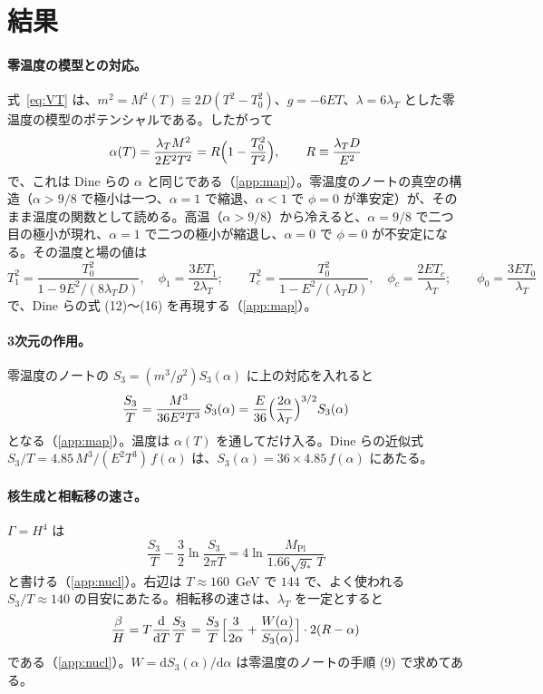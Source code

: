 \documentclass[a4paper,10pt]{ltjsarticle}
\newcommand{\dd}{\mathrm{d}}
\begin{document}
\section{結果}\label{sec:results}

\paragraph{零温度の模型との対応。}式~\eqref{eq:VT} は、$m^2=M^2(T)\equiv2D(T^2-T_0^2)$、$g=-6ET$、$\lambda=6\lambda_T$ とした零温度の模型のポテンシャルである。したがって
\begin{equation}
\alpha(T)=\frac{\lambda_TM^2}{2E^2T^2}=R\Bigl(1-\frac{T_0^2}{T^2}\Bigr),\qquad R\equiv\frac{\lambda_TD}{E^2}
\label{eq:alphaT}
\end{equation}
で、これは Dine らの $\alpha$ と同じである（\ref{app:map}）。零温度のノートの真空の構造（$\alpha>9/8$ で極小は一つ、$\alpha=1$ で縮退、$\alpha<1$ で $\phi=0$ が準安定）が、そのまま温度の関数として読める。高温（$\alpha>9/8$）から冷えると、$\alpha=9/8$ で二つ目の極小が現れ、$\alpha=1$ で二つの極小が縮退し、$\alpha=0$ で $\phi=0$ が不安定になる。その温度と場の値は
\begin{equation}
T_1^2=\frac{T_0^2}{1-9E^2/(8\lambda_TD)},\quad\phi_1=\frac{3ET_1}{2\lambda_T};\qquad
T_c^2=\frac{T_0^2}{1-E^2/(\lambda_TD)},\quad\phi_c=\frac{2ET_c}{\lambda_T};\qquad
\phi_0=\frac{3ET_0}{\lambda_T}
\label{eq:crit}
\end{equation}
で、Dine らの式 (12)〜(16) を再現する（\ref{app:map}）。

\paragraph{3次元の作用。}零温度のノートの $S_3=(m^3/g^2)S_3(\alpha)$ に上の対応を入れると
\begin{equation}
\frac{S_3}{T}=\frac{M^3}{36E^2T^3}\,S_3(\alpha)=\frac{E}{36}\Bigl(\frac{2\alpha}{\lambda_T}\Bigr)^{3/2}S_3(\alpha)
\label{eq:S3T}
\end{equation}
となる（\ref{app:map}）。温度は $\alpha(T)$ を通してだけ入る。Dine らの近似式 $S_3/T=4.85\,M^3/(E^2T^3)\,f(\alpha)$ は、$S_3(\alpha)=36\times4.85\,f(\alpha)$ にあたる。

\paragraph{核生成と相転移の速さ。}$\Gamma=H^4$ は
\begin{equation}
\frac{S_3}{T}-\frac32\ln\frac{S_3}{2\pi T}=4\ln\frac{M_{\mathrm{Pl}}}{1.66\sqrt{g_*}\,T}
\label{eq:nucl}
\end{equation}
と書ける（\ref{app:nucl}）。右辺は $T\approx160$~GeV で $144$ で、よく使われる $S_3/T\approx140$ の目安にあたる。相転移の速さは、$\lambda_T$ を一定とすると
\begin{equation}
\frac\beta H=T\frac{\dd}{\dd T}\frac{S_3}{T}=\frac{S_3}{T}\Bigl[\frac{3}{2\alpha}+\frac{W(\alpha)}{S_3(\alpha)}\Bigr]\cdot2(R-\alpha)
\label{eq:betaH}
\end{equation}
である（\ref{app:nucl}）。$W=\dd S_3(\alpha)/\dd\alpha$ は零温度のノートの手順 (9) で求めてある。
\end{document}
